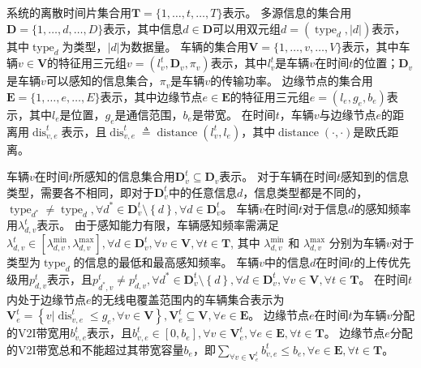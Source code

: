 系统的离散时间片集合用$\mathbf{T}=\{1, \ldots, t, \ldots, T\}$表示。
多源信息的集合用$\mathbf{D}=\{1, \ldots, d, \ldots, D\}$表示，其中信息$d \in \mathbf{D}$可以用双元组$d=\left(\operatorname{type}_d, \left|d\right| \right)$表示，其中$\operatorname{type}_d$为类型，$\left|d\right|$为数据量。
车辆的集合用$\mathbf{V}=\{1, \ldots, v, \ldots, V\}$表示，其中车辆$v \in \mathbf{V}$的特征用三元组$v=\left (l_v^t, \mathbf{D}_v, \pi_v \right )$表示，其中$l_v^t$是车辆$v$在时间$t$的位置；$\mathbf{D}_v$是车辆$v$可以感知的信息集合，$\pi_v$是车辆$v$的传输功率。
边缘节点的集合用$\mathbf{E}=\{1, \ldots, e, \ldots, E\}$表示，其中边缘节点$e \in \mathbf{E}$的特征用三元组$e=\left (l_e, g_e, b_e \right)$表示，其中$l_e$是位置，$g_e$是通信范围，$b_e$是带宽。
在时间$t$，车辆$v$与边缘节点$e$的距离用$\operatorname{dis}_{v,e}^t$表示，且$\operatorname{dis}_{v,e}^t \triangleq \operatorname{distance} \left (l_v^t, l_e \right )$，其中$\operatorname{distance}\left(\cdot,\cdot\right)$是欧氏距离。

车辆$v$在时间$t$所感知的信息集合用$\mathbf{D}_v^t\subseteq \mathbf{D}_v$表示。
对于车辆在时间$t$感知到的信息类型，需要各不相同，即对于$\mathbf{D}_v^t$中的任意信息$d$，信息类型都是不同的，$\operatorname{type}_{d^*} \neq \operatorname{type}_{d}, \forall d^* \in \mathbf{D}_v^t \setminus \left\{ d\right \}, \forall d \in \mathbf{D}_v^t$。
车辆$v$在时间$t$对于信息$d$的感知频率用$\lambda_{d,v}^t$表示。
由于感知能力有限，车辆感知频率需满足$\lambda_{d,v}^{t} \in [\lambda_{d,v}^{\min} , \lambda_{d,v}^{\max} ], \forall d \in \mathbf{D}_v^t, \forall v \in \mathbf{V}, \forall t \in \mathbf{T}$, 其中 $\lambda_{d,v}^{\min}$ 和 $\lambda_{d,v}^{\max}$ 分别为车辆$v$对于类型为$\operatorname{type}_{d}$的信息的最低和最高感知频率。
车辆$v$中的信息$d$在时间$t$的上传优先级用$p_{d,v}^t$表示，且${p}_{d^*, v}^t \neq {p}_{d, v}^t, \forall d^* \in \mathbf{D}_v^t \setminus \left\{ d\right \}, \forall d \in \mathbf{D}_v^t, \forall v \in \mathbf{V}, \forall t \in \mathbf{T}$。
在时间$t$内处于边缘节点$e$的无线电覆盖范围内的车辆集合表示为$\mathbf{V}_e^t=\left \{v \vert \operatorname{dis}_{v,e}^t \leq g_e, \forall v \in \mathbf{V} \right \}, \mathbf{V}_e^t \subseteq \mathbf{V}, \forall e \in \mathbf{E}$。
边缘节点$e$在时间$t$为车辆$v$分配的V2I带宽用$b_{v, e}^t$表示，且$b_{v, e}^t \in \left [0,b_e \right], \forall v \in \mathbf{V}_e^{t}, \forall e \in \mathbf{E}, \forall t \in \mathbf{T}$。
边缘节点$e$分配的V2I带宽总和不能超过其带宽容量$b_e$，即${\sum_{\forall v \in \mathbf{V}_e^{t}}b_{v, e}^t} \leq b_e, \forall e \in \mathbf{E}, \forall t \in \mathbf{T}$。

